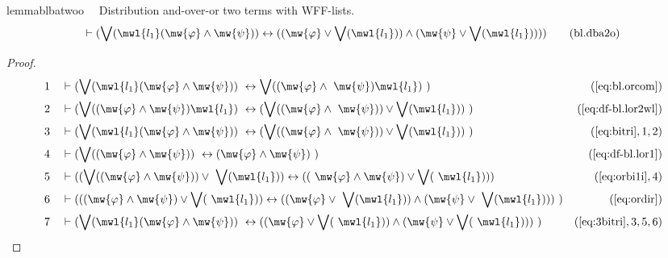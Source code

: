 \begin{restatable}{lemma}{blbatwoo}~~ Distribution and-over-or two terms with
WFF-lists.
\begin{align}
\vdash ( \bigvee( \mwl{l_1} ( \mw{\varphi} \wedge \mw{\psi} ) ) \leftrightarrow
    ( ( \mw{\varphi} \vee \bigvee( \mwl{l_1} ) ) \wedge ( \mw{\psi} \vee
    \bigvee( \mwl{l_1} ) ) ) )\label{eq:bl.dba2o}\tag{bl.dba2o}
\end{align}
\end{restatable}

\begin{proof}
\begin{align}
  1 &&  & \vdash ( \bigvee( \mwl{l_1} ( \mw{\varphi} \wedge \mw{\psi} ) )
     ~\leftrightarrow \bigvee( ( \mw{\varphi} \wedge
     ~\mw{\psi} ) \mwl{l_1} )
     ~)&(\mbox{\ref{eq:bl.orcom}})\notag
  \\ 2 &&  & \vdash ( \bigvee( ( \mw{\varphi} \wedge \mw{\psi} ) \mwl{l_1} )
     ~\leftrightarrow ( \bigvee( ( \mw{\varphi} \wedge
     ~\mw{\psi} ) ) \vee \bigvee( \mwl{l_1} ) )
     ~)&(\mbox{\ref{eq:df-bl.lor2wl}})\notag
  \\ 3 &&  & \vdash ( \bigvee( \mwl{l_1} ( \mw{\varphi} \wedge \mw{\psi} ) )
     ~\leftrightarrow ( \bigvee( ( \mw{\varphi} \wedge
     ~\mw{\psi} ) ) \vee \bigvee( \mwl{l_1} ) )
     ~)&(\mbox{\ref{eq:bitri}},1,2)\notag
  \\ 4 &&  & \vdash ( \bigvee( ( \mw{\varphi} \wedge \mw{\psi} ) )
     ~\leftrightarrow ( \mw{\varphi} \wedge \mw{\psi} )
     ~)&(\mbox{\ref{eq:df-bl.lor1}})\notag
  \\ 5 &&  & \vdash ( ( \bigvee( ( \mw{\varphi} \wedge \mw{\psi} ) ) \vee
     ~\bigvee( \mwl{l_1} ) ) \leftrightarrow ( (
     ~\mw{\varphi} \wedge \mw{\psi} ) \vee \bigvee(
     ~\mwl{l_1} ) ) )&(\mbox{\ref{eq:orbi1i}},4)\notag
  \\ 6 &&  & \vdash ( ( ( \mw{\varphi} \wedge \mw{\psi} ) \vee \bigvee(
     ~\mwl{l_1} ) ) \leftrightarrow ( ( \mw{\varphi} \vee
     ~\bigvee( \mwl{l_1} ) ) \wedge ( \mw{\psi} \vee
     ~\bigvee( \mwl{l_1} ) ) )
     ~)&(\mbox{\ref{eq:ordir}})\notag
  \\ 7 &&  & \vdash ( \bigvee( \mwl{l_1} ( \mw{\varphi} \wedge \mw{\psi} ) )
     ~\leftrightarrow ( ( \mw{\varphi} \vee \bigvee(
     ~\mwl{l_1} ) ) \wedge ( \mw{\psi} \vee \bigvee(
     ~\mwl{l_1} ) ) )
     ~)&(\mbox{\ref{eq:3bitri}},3,5,6)\notag
\end{align}
\end{proof}

